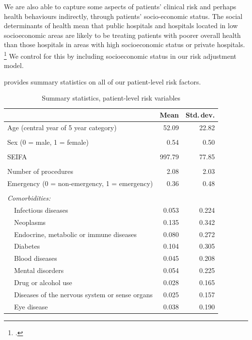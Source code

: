 \documentclass[submission]{grattan}
\begin{document}
We are also able to capture some aspects of patients' clinical risk and perhaps health behaviours indirectly, through patients' socio-economic status.
The social determinants of health mean that public hospitals and hospitals located in low socioeconomic areas are likely to be treating patients with poorer overall health than those hospitals in areas with high socioeconomic status or private hospitals.%
	\footcite{Marmot-2015-TheHealthGap-Challenge-of-unequal-world}
We control for this by including socioeconomic status in our risk adjustment model.

 provides summary statistics on all of our patient-level risk factors.

\begin{table}
\caption{Summary statistics, patient-level risk variables}\label{tbl:summary-statistics-patient-level-risk-vars}
\begin{tabularx}{\linewidth}{lp{.5\linewidth}rr}
\toprule
& & \textbf{Mean} & \textbf{Std.\,dev.}\tabularnewline
\midrule
\multicolumn{2}{l}{Age (central year of 5 year category)}          & 52.09
  & 22.82\tabularnewline
\phantom{.} & & \\[-10pt]
\multicolumn{2}{l}{Sex (0 = male, 1 = female)}                     & 0.54
 & 0.50\tabularnewline
\phantom{.} & & \\[-10pt]
\multicolumn{2}{l}{SEIFA}                                          & 997.79
 & 77.85\tabularnewline
\phantom{.} & & \\[-10pt]
\multicolumn{2}{l}{Number of procedures}                           & 2.08
 & 2.03\tabularnewline
\multicolumn{2}{l}{Emergency (0 = non-emergency, 1 = emergency)}                           & 0.36
 & 0.48\tabularnewline
\phantom{.} & & \\[-10pt]
\multicolumn{2}{l}{\emph{Comorbidities:}}                         &        & \tabularnewline
&Infectious diseases                            & 0.053 & 0.224\tabularnewline
&Neoplasms                                      & 0.135 & 0.342\tabularnewline
&Endocrine, metabolic or immune diseases        & 0.080 & 0.272\tabularnewline
&Diabetes                                       & 0.104 & 0.305\tabularnewline
&Blood diseases                                 & 0.045 & 0.208\tabularnewline
&Mental disorders                               & 0.054 & 0.225\tabularnewline
&Drug or alcohol use                            & 0.028 & 0.165\tabularnewline
&Diseases of the nervous system or sense organs & 0.025 & 0.157\tabularnewline
&Eye disease                                    & 0.038 & 0.190\tabularnewline

\end{tabularx}
\end{table}
\end{document}
